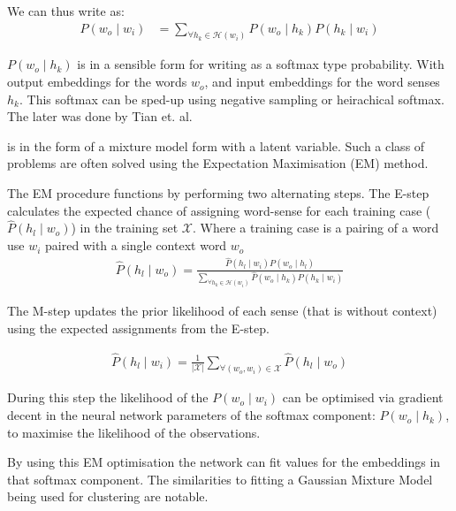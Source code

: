 \documentclass[12pt,parskip]{komatufte}
\begin{document}
We can thus write  as:
\begin{align}
P(w_o\mid w_i) &= \sum_{\forall h_k \in \mathcal{H}(w_i)} P(w_o \mid h_k) P(h_k \mid w_i) \label{equ:tianmm2}
\end{align}

$P(w_o \mid h_k)$ is in a sensible form for writing as a softmax type probability.
With output embeddings for the words $w_o$, and input embeddings for the word senses $h_k$.
This softmax can be sped-up using negative sampling or heirachical softmax.
The later was done by Tian et. al.

 is in the form of a mixture model form with a latent variable.
Such a class of problems are often solved using the Expectation Maximisation (EM) method.

The EM procedure functions by performing two alternating steps.
The E-step calculates the expected chance of assigning word-sense for each training case ($\hat{P}(h_l \mid w_o)$) in the training set $\mathcal{X}$.
Where a training case is a pairing of a word use $w_i$ paired with a single context word $w_o$
\begin{align}
\hat{P}(h_l \mid w_o) = \frac{\hat{P}(h_l \mid w_i) P(w_o \mid h_l)}{\sum_{\forall h_k \in \mathcal{H}(w_i)} \hat{P}(w_o \mid h_k) P(h_k \mid w_i)}
\end{align}

The M-step updates the prior likelihood of each sense (that is without context) using the expected assignments from the E-step.

\begin{align}
\hat{P}(h_l \mid w_i) = \frac{1}{|\mathcal{X}|} \sum_{\forall (w_o,w_i)\in \mathcal{X}} \hat{P}(h_l \mid w_o)
\end{align}

During this step the likelihood of the $P(w_o \mid w_i)$ can be optimised via gradient decent in the neural network parameters of the softmax component: $P(w_o \mid h_k)$,
to maximise the likelihood of the observations.

By using this EM optimisation the network can fit values for the embeddings in that softmax component.
The similarities to fitting a Gaussian Mixture Model being used for clustering are notable.
\end{document}
